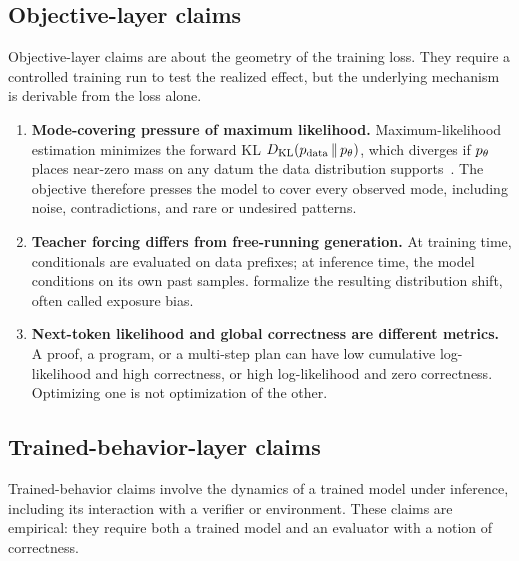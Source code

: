\subsection{Objective-layer claims}
\label{ssec:obj_claims}

Objective-layer claims are about the geometry of the training loss.
They require a controlled training run to test the realized effect, but the underlying mechanism is derivable from the loss alone.

\begin{enumerate}[label=(O\arabic*),leftmargin=2.5em,start=1]
  \item \label{cl:mode_covering}
        \textbf{Mode-covering pressure of maximum likelihood.}
        Maximum-likelihood estimation minimizes the forward KL $D_{\mathrm{KL}}(p_{\mathrm{data}} \,\|\, p_\theta)$, which diverges if $p_\theta$ places near-zero mass on any datum the data distribution supports~\citep{theis2016note,minka2005divergence}.
        The objective therefore presses the model to cover every observed mode, including noise, contradictions, and rare or undesired patterns.

  \item \label{cl:teacher_forcing}
        \textbf{Teacher forcing differs from free-running generation.}
        At training time, conditionals are evaluated on data prefixes;
        at inference time, the model conditions on its own past samples.
        \citet{ranzato2016sequence,bengio2015scheduled} formalize the resulting distribution shift, often called exposure bias.

  \item \label{cl:next_token_misalign}
        \textbf{Next-token likelihood and global correctness are different metrics.}
        A proof, a program, or a multi-step plan can have low cumulative log-likelihood and high correctness, or high log-likelihood and zero correctness.
        Optimizing one is not optimization of the other.
\end{enumerate}

\subsection{Trained-behavior-layer claims}
\label{ssec:trained_claims}

Trained-behavior claims involve the dynamics of a trained model under inference, including its interaction with a verifier or environment.
These claims are empirical: they require both a trained model and an evaluator with a notion of correctness.

